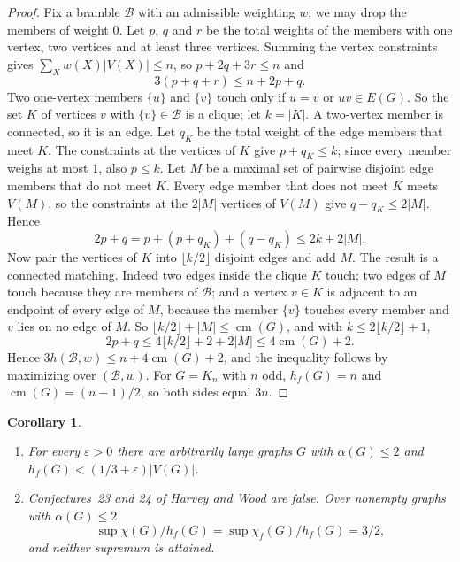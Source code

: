 \documentclass[11pt]{article}
\newtheorem{corollary}[theorem]{Corollary}
\theoremstyle{definition}\newtheorem{conjecture}[theorem]{Conjecture}
\theoremstyle{remark}\newtheorem{remark}[theorem]{Remark}
\newcommand{\cm}{\operatorname{cm}}
\newcommand{\eps}{\varepsilon}
\begin{document}
\begin{proof}
Fix a bramble $\mathcal B$ with an admissible weighting $w$; we may drop the members of weight $0$. Let $p$, $q$ and $r$ be the
total weights of the members with one vertex, two vertices and at least three vertices. Summing the vertex constraints gives
$\sum_X w(X)|V(X)|\le n$, so $p+2q+3r\le n$ and
\[
 3(p+q+r)\le n+2p+q .
\]
Two one-vertex members $\{u\}$ and $\{v\}$ touch only if $u=v$ or $uv\in E(G)$. So the set $K$ of vertices $v$ with
$\{v\}\in\mathcal B$ is a clique; let $k=|K|$. A two-vertex member is connected, so it is an edge. Let $q_K$ be the total
weight of the edge members that meet $K$. The constraints at the vertices of $K$ give $p+q_K\le k$; since every member weighs
at most $1$, also $p\le k$. Let $M$ be a maximal set of pairwise disjoint edge members that do not meet $K$. Every edge
member that does not meet $K$ meets $V(M)$, so the constraints at the $2|M|$ vertices of $V(M)$ give $q-q_K\le2|M|$. Hence
\[
 2p+q=p+(p+q_K)+(q-q_K)\le 2k+2|M| .
\]
Now pair the vertices of $K$ into $\lfloor k/2\rfloor$ disjoint edges and add $M$. The result is a connected matching. Indeed
two edges inside the clique $K$ touch; two edges of $M$ touch because they are members of $\mathcal B$; and a vertex
$v\in K$ is adjacent to an endpoint of every edge of $M$, because the member $\{v\}$ touches every member and $v$ lies on no
edge of $M$. So $\lfloor k/2\rfloor+|M|\le\cm(G)$, and with $k\le2\lfloor k/2\rfloor+1$,
\[
 2p+q\le 4\lfloor k/2\rfloor+2+2|M|\le4\cm(G)+2 .
\]
Hence $3h(\mathcal B,w)\le n+4\cm(G)+2$, and the inequality follows by maximizing over $(\mathcal B,w)$. For $G=K_n$ with $n$
odd, $h_f(G)=n$ and $\cm(G)=(n-1)/2$, so both sides equal $3n$.
\end{proof}

\begin{corollary}\label{c:hf}
\begin{enumerate}
\item[(i)] For every $\eps>0$ there are arbitrarily large graphs $G$ with $\alpha(G)\le2$ and
$h_f(G)<(1/3+\eps)|V(G)|$.
\item[(ii)] Conjectures~23 and 24 of Harvey and Wood are false. Over nonempty graphs with $\alpha(G)\le2$,
\[
 \sup\chi(G)/h_f(G)=\sup\chi_f(G)/h_f(G)=3/2 ,
\]
and neither supremum is attained.
\end{enumerate}
\end{corollary}
\end{document}
